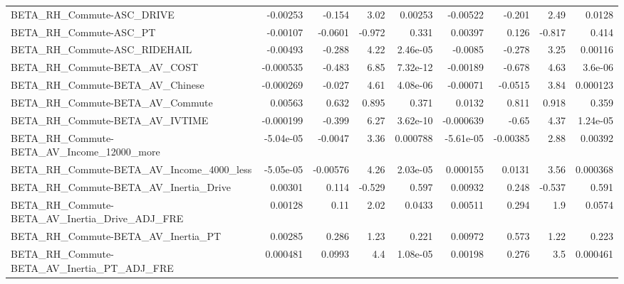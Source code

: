 \begin{tabular}{lrrrrrrrr}
BETA\_RH\_Commute-ASC\_DRIVE                          &    -0.00253 &       -0.154 &     3.02 &  0.00253 &   -0.00522 &      -0.201 &         2.49 &        0.0128 \\
BETA\_RH\_Commute-ASC\_PT                             &    -0.00107 &      -0.0601 &   -0.972 &    0.331 &    0.00397 &       0.126 &       -0.817 &         0.414 \\
BETA\_RH\_Commute-ASC\_RIDEHAIL                       &    -0.00493 &       -0.288 &     4.22 & 2.46e-05 &    -0.0085 &      -0.278 &         3.25 &       0.00116 \\
BETA\_RH\_Commute-BETA\_AV\_COST                       &   -0.000535 &       -0.483 &     6.85 & 7.32e-12 &   -0.00189 &      -0.678 &         4.63 &       3.6e-06 \\
BETA\_RH\_Commute-BETA\_AV\_Chinese                    &   -0.000269 &       -0.027 &     4.61 & 4.08e-06 &   -0.00071 &     -0.0515 &         3.84 &      0.000123 \\
BETA\_RH\_Commute-BETA\_AV\_Commute                    &     0.00563 &        0.632 &    0.895 &    0.371 &     0.0132 &       0.811 &        0.918 &         0.359 \\
BETA\_RH\_Commute-BETA\_AV\_IVTIME                     &   -0.000199 &       -0.399 &     6.27 & 3.62e-10 &  -0.000639 &       -0.65 &         4.37 &      1.24e-05 \\
BETA\_RH\_Commute-BETA\_AV\_Income\_12000\_more          &   -5.04e-05 &      -0.0047 &     3.36 & 0.000788 &  -5.61e-05 &    -0.00385 &         2.88 &       0.00392 \\
BETA\_RH\_Commute-BETA\_AV\_Income\_4000\_less           &   -5.05e-05 &     -0.00576 &     4.26 & 2.03e-05 &   0.000155 &      0.0131 &         3.56 &      0.000368 \\
BETA\_RH\_Commute-BETA\_AV\_Inertia\_Drive              &     0.00301 &        0.114 &   -0.529 &    0.597 &    0.00932 &       0.248 &       -0.537 &         0.591 \\
BETA\_RH\_Commute-BETA\_AV\_Inertia\_Drive\_ADJ\_FRE      &     0.00128 &         0.11 &     2.02 &   0.0433 &    0.00511 &       0.294 &          1.9 &        0.0574 \\
BETA\_RH\_Commute-BETA\_AV\_Inertia\_PT                 &     0.00285 &        0.286 &     1.23 &    0.221 &    0.00972 &       0.573 &         1.22 &         0.223 \\
BETA\_RH\_Commute-BETA\_AV\_Inertia\_PT\_ADJ\_FRE         &    0.000481 &       0.0993 &      4.4 & 1.08e-05 &    0.00198 &       0.276 &          3.5 &      0.000461 \\

\end{tabular}
